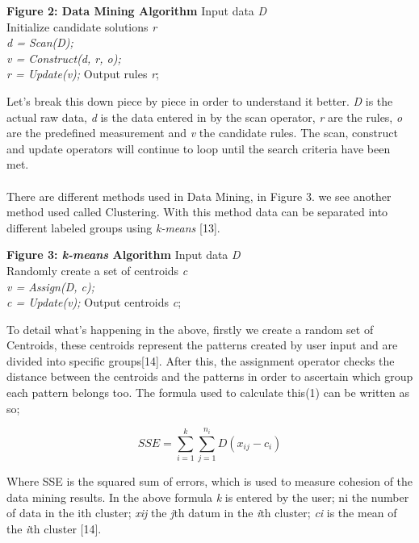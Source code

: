 \documentclass[10pt,journal,compsoc]{IEEEtran}
\begin{document}
\begin{algoBox}{\textbf{Figure 2: Data Mining Algorithm}}
	{Input data \textit{D}}\\
	{Initialize candidate solutions \textit{r}}\\
	{
		\textit{d = Scan(D);\\
			v = Construct(d, r, o);\\
			r = Update(v);}
	}
	Output rules \textit{r};
\end{algoBox}

Let's break this down piece by piece in order to understand it better. \textit{D} is the actual raw data, \textit{d} is the data entered in by the scan operator, \textit{r} are the rules, \textit{o} are the predefined measurement and \textit{v} the candidate rules. The scan, construct and update operators will continue to loop until the search criteria have been met.\\\\
There are different methods used in Data Mining, in Figure 3\textsl{}. we see another method used called Clustering. With this method data can be separated into different labeled groups using \textit{k-means} [13].\\


\begin{algoBox}{\textbf{Figure 3: \textit{k-means} Algorithm}}
	{Input data \textit{D}}\\
	{Randomly create a set of centroids \textit{c}}\\
	{
		\textit{v = Assign(D, c);\\
			c = Update(v);}
	}
	Output centroids \textit{c};
\end{algoBox}

To detail what's happening in the above, firstly we create a random set of Centroids, these centroids represent the patterns created by user input and are divided into specific groups[14]. After this, the assignment operator checks the distance between the centroids and the patterns in order to ascertain which group each pattern belongs too. The formula used to calculate this(1) can be written as so;

\begin{equation}
	SSE = \sum_{i=1}^{k} \sum_{j=1}^{n_i} D( x_{ij} - c_i)
\end{equation}

Where SSE is the squared sum of errors, which is used to measure cohesion of the data mining results. In the above formula \textit{k} is entered by the user; ni the number of
data in the ith cluster; \textit{xij} the \textit{j}th datum in the \textit{i}th cluster; \textit{ci} is the mean of the \textit{i}th cluster [14]. 
\end{document}
